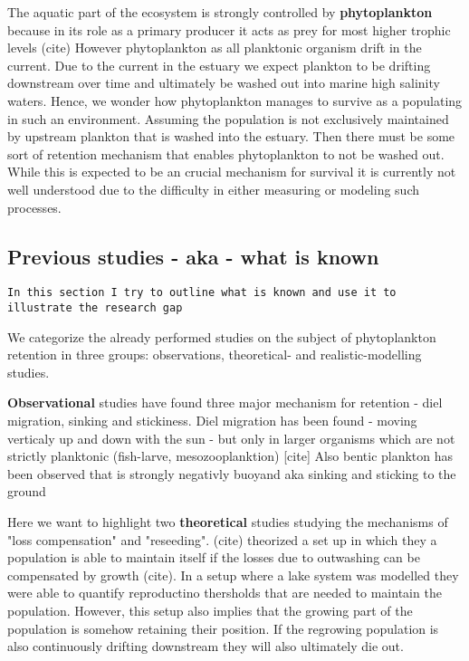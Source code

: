 The aquatic part of the ecosystem is strongly controlled by \textbf{phytoplankton} because in its role as a primary producer it acts as prey for most higher trophic levels (cite)
However phytoplankton as all planktonic organism drift in the current. Due to the current in the estuary we expect plankton to be drifting downstream over time and ultimately be washed out into marine high salinity waters.
Hence, we wonder how phytoplankton manages to survive as a populating in such an environment.
Assuming the population is not exclusively maintained by upstream plankton that is washed into the estuary. Then there must be some sort of retention mechanism that enables phytoplankton to not be washed out.
While this is expected to be an crucial mechanism for survival it is currently not well understood due to the difficulty in either measuring or modeling such processes.


\subsection*{Previous studies - aka - what is known}

\texttt{In this section I try to outline what is known and use it to illustrate the research gap}
\smallskip

We categorize the already performed studies on the subject of phytoplankton retention in three groups: observations, theoretical- and realistic-modelling studies.

\textbf{Observational} studies have found three major mechanism for retention - diel migration, sinking and stickiness.
Diel migration has been found - moving verticaly up and down with the sun - but only in larger organisms which are not strictly planktonic (fish-larve, mesozooplanktion) [cite]
Also bentic plankton has been observed that is strongly negativly buoyand aka sinking and sticking to the ground

Here we want to highlight two \textbf{theoretical} studies studying the mechanisms of "loss compensation" and "reseeding".
(cite) theorized a set up in which they  a population is able to maintain itself if the losses due to outwashing can be compensated by growth (cite).
In a setup where a lake system was modelled they were able to quantify reproductino thersholds that are needed to maintain the population.
However, this setup also implies that the growing part of the population is somehow retaining their position.
If the regrowing population is also continuously drifting downstream they will also ultimately die out.

